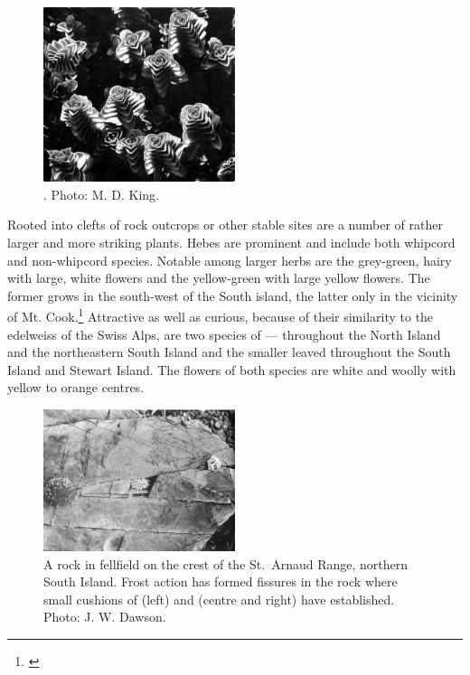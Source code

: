 \begin{figure}
	\includegraphics[width=0.5\textwidth]{graphics/figure106hebe.jpg}
	\centering
	\caption[Hebe epacridea]{.
	Photo: M. D. King.}%
	\label{fig:106hebe}
\end{figure}

Rooted into clefts of rock outcrops or other stable sites are a number of rather larger and more striking plants.
Hebes are prominent and include both whipcord and non-whipcord species.
Notable among larger herbs are the grey-green, hairy  with large, white flowers and the yellow-green  with large yellow flowers.
The former grows in the south-west of the South island, the latter only in the vicinity of Mt.
Cook.\footnote{\cite{wilson1978wild}}
Attractive as well as curious, because of their similarity to the edelweiss of the Swiss Alps, are two species of  ---  throughout the North Island and the northeastern South Island and the smaller leaved  throughout the South Island and Stewart Island.
The flowers of both species are white and woolly with yellow to orange centres.

\begin{figure}
	\includegraphics[width=0.5\textwidth]{graphics/figure107fellfield-rock.jpg}
	\centering
	\caption[A rock in fellfield on the crest of the St.\ Arnaud Range]{A rock in fellfield on the crest of the St.\ Arnaud Range, northern South Island.
	Frost action has formed fissures in the rock where small cushions of  (left) and  (centre and right) have established.
	Photo: J. W. Dawson.}%
	\label{fig:107fellfield-rock}
\end{figure}

